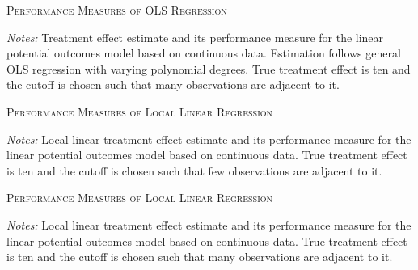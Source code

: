 \documentclass[11pt, a4paper, leqno]{article}
\begin{document}
\begin{table}
	\centering

	

	\caption{\textsc{Performance Measures of OLS Regression}}
	\label{tab:perform_meas_table_linear_parametric_discrete_False_c_10}
	\medskip
	\raggedright
	\footnotesize
	\textit{Notes:} Treatment effect estimate and its performance measure for the linear potential outcomes model based on continuous data. Estimation follows general OLS regression with varying polynomial degrees. True treatment effect is ten and the cutoff is chosen such that many observations are adjacent to it. \\
\end{table}




\begin{table}
	\centering

	

	\caption{\textsc{Performance Measures of Local Linear Regression}}
	\label{tab:perform_meas_table_linear_nonparametric_discrete_False_c_1}
	\medskip
	\raggedright
	\footnotesize
	\textit{Notes:} Local linear treatment effect estimate and its performance measure for the linear potential outcomes model based on continuous data. True treatment effect is ten and the cutoff is chosen such that few observations are adjacent to it. \\
\end{table}


\begin{table}
	\centering

	

	\caption{\textsc{Performance Measures of Local Linear Regression}}
	\label{tab:perform_meas_table_linear_nonparametric_discrete_False_c_10}
	\medskip
	\raggedright
	\footnotesize
	\textit{Notes:} Local linear treatment effect estimate and its performance measure for the linear potential outcomes model based on continuous data. True treatment effect is ten and the cutoff is chosen such that many observations are adjacent to it. \\
\end{table}








\end{document}
